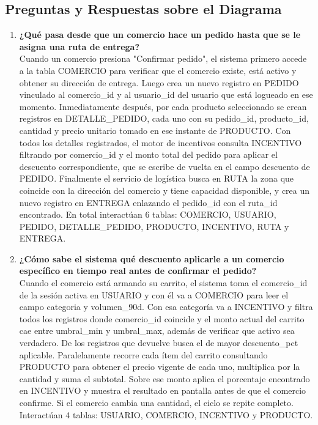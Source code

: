 \documentclass[12pt, a4paper]{report}
\begin{document}
\subsection{Preguntas y Respuestas sobre el Diagrama}

\begin{enumerate}
    \item \textbf{¿Qué pasa desde que un comercio hace un pedido hasta que se le asigna una ruta de entrega?} \\
    Cuando un comercio presiona "Confirmar pedido", el sistema primero accede a la tabla COMERCIO para verificar que el comercio existe, está activo y obtener su dirección de entrega. Luego crea un nuevo registro en PEDIDO vinculado al comercio\_id y al usuario\_id del usuario que está logueado en ese momento. Inmediatamente después, por cada producto seleccionado se crean registros en DETALLE\_PEDIDO, cada uno con su pedido\_id, producto\_id, cantidad y precio unitario tomado en ese instante de PRODUCTO. Con todos los detalles registrados, el motor de incentivos consulta INCENTIVO filtrando por comercio\_id y el monto total del pedido para aplicar el descuento correspondiente, que se escribe de vuelta en el campo descuento de PEDIDO. Finalmente el servicio de logística busca en RUTA la zona que coincide con la dirección del comercio y tiene capacidad disponible, y crea un nuevo registro en ENTREGA enlazando el pedido\_id con el ruta\_id encontrado. En total interactúan 6 tablas: COMERCIO, USUARIO, PEDIDO, DETALLE\_PEDIDO, PRODUCTO, INCENTIVO, RUTA y ENTREGA.

    \item \textbf{¿Cómo sabe el sistema qué descuento aplicarle a un comercio específico en tiempo real antes de confirmar el pedido?} \\
    Cuando el comercio está armando su carrito, el sistema toma el comercio\_id de la sesión activa en USUARIO y con él va a COMERCIO para leer el campo categoria y volumen\_90d. Con esa categoría va a INCENTIVO y filtra todos los registros donde comercio\_id coincide y el monto actual del carrito cae entre umbral\_min y umbral\_max, además de verificar que activo sea verdadero. De los registros que devuelve busca el de mayor descuento\_pct aplicable. Paralelamente recorre cada ítem del carrito consultando PRODUCTO para obtener el precio vigente de cada uno, multiplica por la cantidad y suma el subtotal. Sobre ese monto aplica el porcentaje encontrado en INCENTIVO y muestra el resultado en pantalla antes de que el comercio confirme. Si el comercio cambia una cantidad, el ciclo se repite completo. Interactúan 4 tablas: USUARIO, COMERCIO, INCENTIVO y PRODUCTO.


\end{enumerate}
\end{document}
